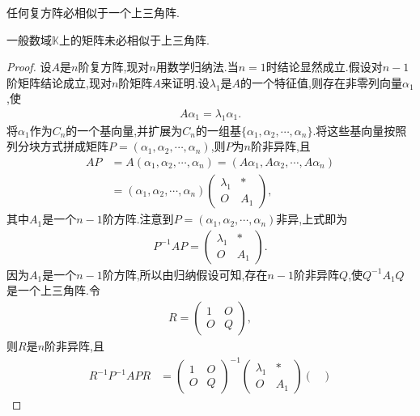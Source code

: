 \documentclass[lang=cn,newtx,10pt,scheme=chinese]{elegantbook}
\begin{document}
\begin{theorem}[复方阵必相似于上三角阵]\label{theorem:复方阵必相似于上三角阵}
任何复方阵必相似于一个上三角阵.
\end{theorem}
\begin{remark}
一般数域$\mathbb{K}$上的矩阵未必相似于上三角阵.
\end{remark}
\begin{proof}
设$A$是$n$阶复方阵,现对$n$用数学归纳法.当$n=1$时结论显然成立.假设对$n-1$阶矩阵结论成立,现对$n$阶矩阵$A$来证明.设$\lambda_1$是$A$的一个特征值,则存在非零列向量$\alpha_1$,使
\begin{align*}
A \alpha_1 = \lambda_1 \alpha_1.
\end{align*}
将$\alpha_1$作为$C_n$的一个基向量,并扩展为$C_n$的一组基$\{\alpha_1, \alpha_2, \cdots, \alpha_n\}$.将这些基向量按照列分块方式拼成矩阵$P = (\alpha_1, \alpha_2, \cdots, \alpha_n)$,则$P$为$n$阶非异阵,且
\begin{align*}
AP &= A(\alpha_1, \alpha_2, \cdots, \alpha_n) = (A\alpha_1, A\alpha_2, \cdots, A\alpha_n) \\
&= (\alpha_1, \alpha_2, \cdots, \alpha_n) \begin{pmatrix}
\lambda_1 & * \\
O & A_1
\end{pmatrix},
\end{align*}
其中$A_1$是一个$n-1$阶方阵.注意到$P = (\alpha_1, \alpha_2, \cdots, \alpha_n)$非异,上式即为
\begin{align*}
P^{-1}AP = \begin{pmatrix}
\lambda_1 & * \\
O & A_1
\end{pmatrix}.
\end{align*}
因为$A_1$是一个$n-1$阶方阵,所以由归纳假设可知,存在$n-1$阶非异阵$Q$,使$Q^{-1}A_1Q$是一个上三角阵.令
\begin{align*}
R = \begin{pmatrix}
1 & O \\
O & Q
\end{pmatrix},
\end{align*}
则$R$是$n$阶非异阵,且
\begin{align*}
R^{-1}P^{-1}APR &= \begin{pmatrix}
1 & O \\
O & Q
\end{pmatrix}^{-1} \begin{pmatrix}
\lambda_1 & * \\
O & A_1
\end{pmatrix} \begin{pmatrix}

\end{pmatrix}
\end{align*}
\end{proof}
\end{document}
